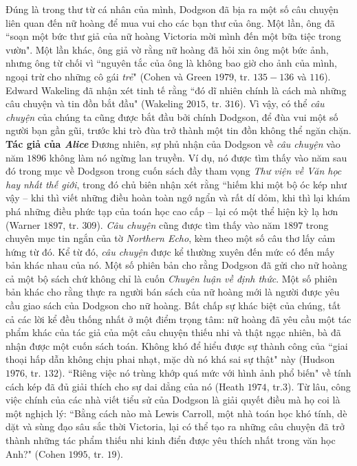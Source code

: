 \begin{multicols}{2}
	\vskip 0.1cm
	Đúng là trong thư từ cá nhân của mình, Dodgson đã bịa ra một số câu chuyện liên quan đến nữ hoàng để mua vui cho các bạn thư của ông. Một lần, ông đã ``soạn một bức thư giả của nữ hoàng Victoria mời mình đến một bữa tiệc trong vườn". Một lần khác, ông giả vờ rằng nữ hoàng đã hỏi xin ông một bức ảnh, nhưng ông từ chối vì ``nguyên tắc của ông là không bao giờ cho ảnh của mình, ngoại trừ cho những cô gái \textit{trẻ}" (Cohen và Green $1979$, tr. $135-136$ và $116$). Edward Wakeling đã nhận xét tinh tế rằng ``đó dĩ nhiên chính là cách mà những câu chuyện và tin đồn bắt đầu" (Wakeling $2015$, tr. $316$). Vì vậy, có thể \textit{câu chuyện} của chúng ta cũng được bắt đầu bởi chính Dodgson, để đùa vui một số người bạn gần gũi, trước khi trò đùa trở thành một tin đồn không thể ngăn chặn.
	\vskip 0.1cm
	\textbf{\color{quantoan}Tác giả của \textit{Alice}}
	\vskip 0.1cm
	Đương nhiên, sự phủ nhận của Dodgson về \textit{câu chuyện} vào năm $1896$ không làm nó ngừng lan truyền. Ví dụ, nó được tìm thấy vào năm sau đó trong mục về Dodgson trong cuốn sách đầy tham vọng \textit{Thư viện về Văn học hay nhất thế giới}, trong đó chủ biên nhận xét rằng 
	\vskip 0.1cm
	``hiếm khi một bộ óc kép như vậy -- khi thì viết những điều hoàn toàn ngớ ngẩn và rất dí dỏm, khi thì lại khám phá những điều phức tạp của toán học cao cấp -- lại có một thể hiện kỳ lạ hơn (Warner $1897$, tr. $309$).
	\vskip 0.1cm
	\textit{Câu chuyện} cũng được tìm thấy vào năm $1897$ trong chuyên mục tin ngắn của tờ \textit{Northern Echo}, kèm theo một số câu thơ lấy cảm hứng từ đó.
	\vskip 0.1cm
	Kể từ đó, \textit{câu chuyện} được kể thường xuyên đến mức có đến mấy bản khác nhau của nó. Một số phiên bản cho rằng Dodgson đã gửi cho nữ hoàng cả một bộ sách chứ không chỉ là cuốn \textit{Chuyên luận về định thức}. Một số phiên bản khác cho rằng thực ra người bán sách của nữ hoàng mới là người được yêu cầu giao sách của Dodgson cho nữ hoàng. Bất chấp sự khác biệt của chúng, tất cả các lời kể đều thống nhất ở một điểm trọng tâm: nữ hoàng đã yêu cầu một tác phẩm khác của tác giả của một câu chuyện thiếu nhi và thật ngạc nhiên, bà đã nhận được một cuốn sách toán.
	\vskip 0.1cm
	Không khó để hiểu được sự thành công của ``giai thoại hấp dẫn không chịu phai nhạt, mặc dù nó khá sai sự thật" này (Hudson $1976$, tr. $132$). ``Riêng việc nó trùng khớp quá mức với hình ảnh phổ biến" về tính cách kép đã đủ giải thích cho sự dai dẳng của nó (Heath $1974$, tr.$3$). Từ lâu, công việc chính của các nhà viết tiểu sử của Dodgson là giải quyết điều mà họ coi là một nghịch lý: ``Bằng cách nào mà Lewis Carroll, một nhà toán học  khó tính, dè dặt và sùng đạo sâu sắc thời Victoria, lại có thể tạo ra những câu chuyện đã trở thành những tác phẩm thiếu nhi kinh điển được yêu thích nhất trong văn học Anh?" (Cohen $1995$, tr. $19$).

\end{multicols}
